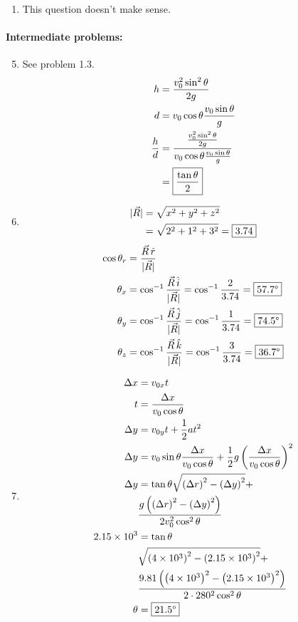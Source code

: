 \documentclass[12pt,letterpaper]{article}
\begin{document}
\begin{multicols}{2}
\begin{enumerate}
\item
This question doesn't make sense.
\end{enumerate}
\paragraph{Intermediate problems:}
\begin{enumerate}
\setcounter{enumi}{4}
\item See problem 1.3.
\[
\begin{aligned}
h &= \frac{v_0^2\sin^2 \theta}{2g}\\
d &= v_0\cos \theta \frac{v_0\sin \theta}{g}\\
\frac{h}{d} &= \frac{\frac{v_0^2\sin^2 \theta}{2g}}{v_0\cos \theta \frac{v_0\sin \theta}{g}}\\
            &= \fbox{$\displaystyle \frac{\tan \theta}{2}$}
\end{aligned}
\]

\item \[
\begin{aligned}
|\vec{R}| &= \sqrt{x^2+y^2+z^2}\\
          &= \sqrt{2^2+1^2+3^2} = \fbox{3.74}
\end{aligned}
\] \[
\begin{aligned}
\cos \theta_r &= \frac{\vec{R}\,\hat{r}}{|\vec{R}|}\\
\theta_x &= \cos^{-1} \frac{\vec{R}\,\hat{i}}{|\vec{R}|} = \cos^{-1} \frac{2}{3.74} = \fbox{57.7$\degree$}\\
\theta_y &= \cos^{-1} \frac{\vec{R}\,\hat{j}}{|\vec{R}|} = \cos^{-1} \frac{1}{3.74} = \fbox{74.5$\degree$}\\
\theta_z &= \cos^{-1} \frac{\vec{R}\,\hat{k}}{|\vec{R}|} = \cos^{-1} \frac{3}{3.74} = \fbox{36.7$\degree$}
\end{aligned}
\]

\item
\vspace{-5pt}
\[
\begin{aligned}
\Delta x &= v_{0x}t\\
t &= \frac{\Delta x}{v_0\cos \theta}\\
\Delta y &= v_{0y}t + \frac{1}{2}at^2\\
\Delta y &= v_0\sin \theta \frac{\Delta x}{v_0\cos \theta} + \frac{1}{2}g\left(\frac{\Delta x}{v_0\cos \theta}\right)^2\\
\Delta y &= \tan \theta \sqrt{\left(\Delta r\right)^2 - \left(\Delta y\right)^2} +\\
         &  \frac{g\left(\left(\Delta r\right)^2 - \left(\Delta y\right)^2\right)}{2v_0^2\cos^2 \theta}\\
2.15 \times 10^3 &= \tan \theta\\
         &  \sqrt{\left(4 \times 10^3\right)^2 - \left(2.15 \times 10^3\right)^2} +\\
         &  \frac{9.81 \left(\left(4 \times 10^3\right)^2 - \left(2.15 \times 10^3\right)^2\right)}{2\cdot 280^2\cos^2 \theta}\\
\theta &= \fbox{21.5\degree}
\end{aligned}
\]
\end{enumerate}

\end{multicols}
\end{document}
